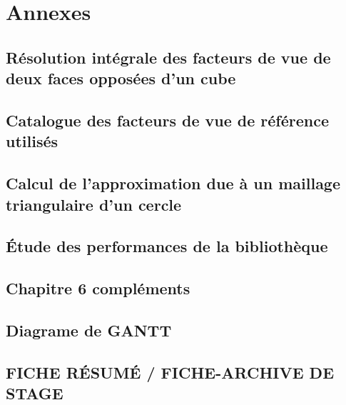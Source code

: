 \chapter{Annexes}

\section{Résolution intégrale des facteurs de vue de deux faces opposées d'un cube}
\label{anx:int}


\section{Catalogue des facteurs de vue de référence utilisés}
\label{anx:fv}


\newpage
\section{Calcul de l'approximation due à un maillage triangulaire d'un cercle}
\label{anx:cc}
\label{annexe:geom} 


\newpage
\section{Étude des performances de la bibliothèque \emb} 
\label{annexe:perf_embree} 


\newpage
\section{Chapitre 6 compléments} 
\label{annexe:resultats} 




\newpage
\section{Diagrame de GANTT}


\section{FICHE RÉSUMÉ / FICHE-ARCHIVE DE STAGE}



%